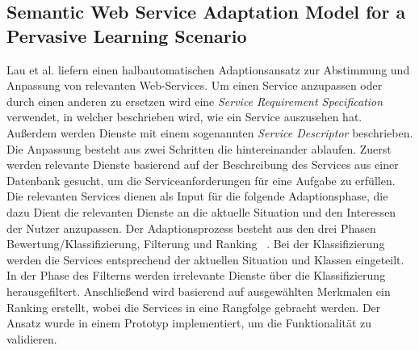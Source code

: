 \documentclass[conference,compsoc]{IEEEtran}
\begin{document}
\subsection{Semantic Web Service Adaptation Model for a Pervasive Learning Scenario}
Lau et al.\cite{lau2008semantic} liefern einen halbautomatischen Adaptionsansatz zur Abstimmung und Anpassung von relevanten Web-Services. Um einen Service anzupassen oder durch einen anderen zu ersetzen wird eine \textit{Service Requirement Specification} verwendet, in welcher beschrieben wird, wie ein Service auszusehen hat. Außerdem werden Dienste mit einem sogenannten \textit{Service Descriptor} beschrieben. Die Anpassung besteht aus zwei Schritten die hintereinander ablaufen. Zuerst werden relevante Dienste basierend auf der Beschreibung des Services aus einer Datenbank gesucht, um die Serviceanforderungen für eine Aufgabe zu erfüllen. Die relevanten Services dienen als Input für die folgende Adaptionsphase, die dazu Dient die relevanten Dienste an die aktuelle Situation und den Interessen der Nutzer anzupassen. Der Adaptionsprozess besteht aus den drei Phasen Bewertung/Klassifizierung, Filterung und Ranking ~\cite{lau2008semantic}. Bei der Klassifizierung werden die Services entsprechend der aktuellen Situation und Klassen eingeteilt. In der Phase des Filterns werden irrelevante Dienste über die Klassifizierung herausgefiltert. Anschließend wird basierend auf ausgewählten Merkmalen ein Ranking erstellt, wobei die Services in eine Rangfolge gebracht werden.
Der Ansatz wurde in einem Prototyp implementiert, um die Funktionalität zu validieren.
\end{document}
